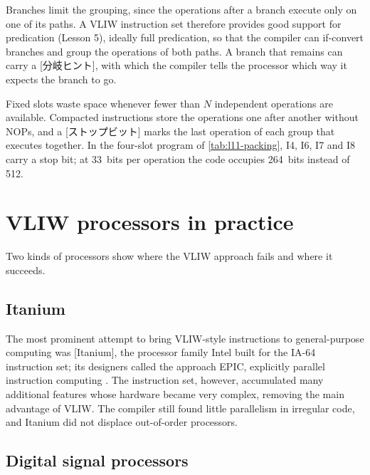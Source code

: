\documentclass[../main.tex]{subfiles}
\begin{document}
Branches limit the grouping, since the operations after a branch execute only
on one of its paths.  A VLIW instruction set therefore provides good support
for predication (Lesson 5), ideally full predication,
so that the compiler can if-convert branches and group
the operations of both paths.  A branch that remains can carry a
[分岐ヒント], with which the compiler tells the processor
which way it expects the branch to go.

Fixed slots waste space whenever fewer than $N$ independent operations are
available.  Compacted instructions store the operations one after another
without NOPs, and a [ストップビット] marks the last operation
of each group that executes together.  In the four-slot program of
\cref{tab:l11-packing}, I4, I6, I7 and I8 carry a stop bit; at 33~bits per
operation the code occupies 264~bits instead of 512.

\section{VLIW processors in practice}
\label{sec:l11-examples}

Two kinds of processors show where the VLIW approach fails and where it
succeeds.

\subsection{Itanium}
\label{sec:l11-itanium}

The most prominent attempt to bring VLIW-style instructions to general-purpose
computing was [Itanium], the processor family Intel built for
the IA-64 instruction set; its designers called the approach EPIC, explicitly
parallel instruction computing \cite{schlansker2000}.  The instruction set, however, accumulated
many additional features whose hardware became very complex, removing the main
advantage of VLIW.  The compiler still found little parallelism in irregular
code, and Itanium did not displace out-of-order processors.

\subsection{Digital signal processors}
\label{sec:l11-dsp}
\end{document}
